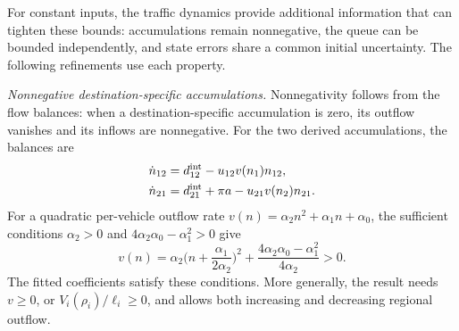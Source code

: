 \documentclass[final]{cas-sc}
\theoremstyle{definition}
\theoremstyle{plain}
\theoremstyle{definition}
\theoremstyle{plain}
\begin{document}
For constant inputs, the traffic dynamics provide additional
information that can tighten these bounds: accumulations remain
nonnegative, the queue can be bounded independently, and state errors
share a common initial uncertainty. The following refinements use each
property.

\medskip
\noindent\emph{Nonnegative destination-specific accumulations.}
Nonnegativity follows from the flow balances: when a
destination-specific accumulation is zero, its outflow vanishes and its
inflows are nonnegative. For the two derived accumulations, the
balances are
\begin{equation}
\begin{aligned}
\dot n_{12}&=d_{12}^{\rm int}-u_{12}v(n_1)n_{12},\\
\dot n_{21}&=d_{21}^{\rm int}+\pi a-u_{21}v(n_2)n_{21}.
\end{aligned}
\label{eq:structure-derived-classes}
\end{equation}
For a quadratic per-vehicle outflow rate
$v(n)=\alpha_2n^2+\alpha_1n+\alpha_0$, the sufficient conditions
$\alpha_2>0$ and $4\alpha_2\alpha_0-\alpha_1^2>0$ give
\begin{equation}
v(n)=\alpha_2\Big(n+\frac{\alpha_1}{2\alpha_2}\Big)^2
+\frac{4\alpha_2\alpha_0-\alpha_1^2}{4\alpha_2}>0.
\label{eq:structure-positive-factor}
\end{equation}
The fitted coefficients satisfy these conditions. More generally, the
result needs $v\ge0$, or $V_i(\rho_i)/\ell_i\ge0$, and allows both
increasing and decreasing regional outflow.
\end{document}
